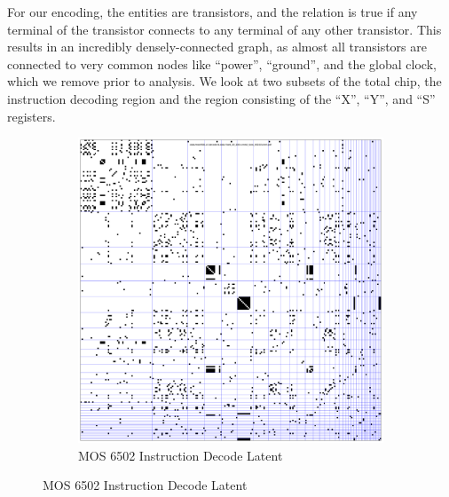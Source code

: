 \documentclass{article}
\begin{document}
For our encoding, the entities are transistors, and the relation is
true if any terminal of the transistor connects to any terminal of any
other transistor. This results in an incredibly densely-connected
graph, as almost all transistors are connected to very common nodes
like ``power'', ``ground'', and the global clock, which we remove
prior to analysis. We look at two subsets of the total chip, the
instruction decoding region and the region consisting of the ``X'',
``Y'', and ``S'' registers.

\begin{figure}[h]
\centering
\begin{subfigure}[b]{0.43\textwidth}
  \includegraphics[width=\textwidth]{mos6502/mos6502.all.decode.ld.data-fixed_20_200-anneal_slow_400.0.latent.pdf}
  \caption{MOS 6502 Instruction Decode Latent}
\end{subfigure}
  

\end{figure}
\end{document}
